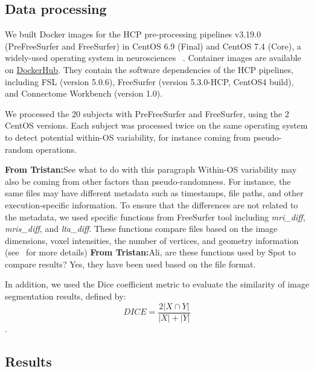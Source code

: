 \documentclass[a4paper,num-refs]{oup-contemporary}
\newcommand{\tristan}[1]{\color{blue}\textbf{From Tristan:}#1\color{black}}
\newcommand{\toolname}[0]{Spot\xspace}
\begin{document}
\subsection{Data processing}

We built Docker images for the HCP pre-processing pipelines v3.19.0
(PreFreeSurfer and FreeSurfer) in CentOS 6.9 (Final) and CentOS 7.4 (Core),
a widely-used operating system in neurosciences
~\cite{hanke2011neuroscience}. Container images are available on
\href{https://hub.docker.com/r/bigdatalabteam/hcp-prefreesurfer/}{DockerHub}.
They contain the software dependencies of the HCP pipelines, including FSL
(version 5.0.6), FreeSurfer (version 5.3.0-HCP, CentOS4 build), and
Connectome Workbench (version 1.0).

We processed the 20 subjects with PreFreeSurfer and FreeSurfer, using the 2
CentOS versions. Each subject was processed twice on the same operating
system to detect potential within-OS variability, for instance coming from
pseudo-random operations. 

\tristan{See what to do with this paragraph}
Within-OS variability may also be coming from other factors than
pseudo-randomness. For instance, the same files may have different metadata
such as timestamps, file paths, and other execution-specific information.
To ensure that the differences are not related to the metadata, we used
specific functions from FreeSurfer tool including \emph{mri\_diff},
\emph{mris\_diff}, and \emph{lta\_diff}. These functions compare files
based on the image dimensions, voxel intensities, the number of vertices,
and geometry information (see~\cite{fischl2012freesurfer} for more
details) \tristan{Ali, are these functions used by \toolname to compare results?
Yes, they have been used based on the file format}.

In addition, we used the Dice coefficient metric to evaluate the
similarity of image segmentation results, defined by:
\[DICE=\frac{2|X \cap Y|}{|X| + |Y|}\].



\subsection{Results}

\end{document}

